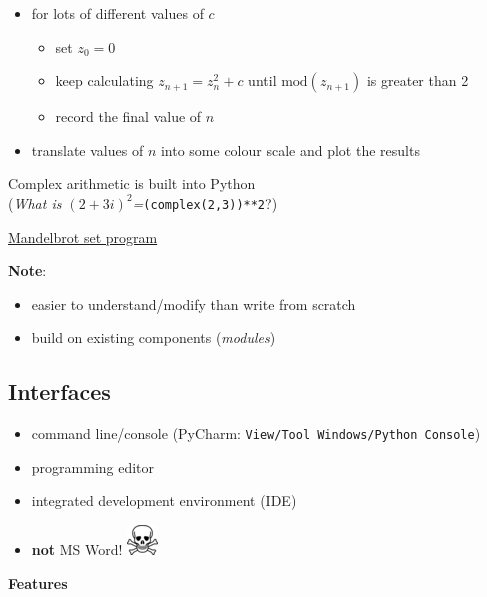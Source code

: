 \documentclass[]{tufte-handout}
\begin{document}
\begin{itemize}
\itemsep1pt\parskip0pt
\item
  for lots of different values of \(c\)

  \begin{itemize}
  \itemsep1pt\parskip0pt
  \item
    set \(z_0=0\)
  \item
    keep calculating \(z_{n+1}=z_n^2+c\) until \(\textrm{mod}(z_{n+1})\)
    is greater than 2
  \item
    record the final value of \(n\)
  \end{itemize}
\item
  translate values of \(n\) into some colour scale and plot the results
\end{itemize}

Complex arithmetic is built into Python\\(\emph{What is
\((2+3i)^2\)=}\texttt{(complex(2,3))**2}?)

\href{../code/mandelbrot.py}{Mandelbrot set program}

\textbf{Note}:

\begin{itemize}
\itemsep1pt\parskip0pt
\item
  easier to understand/modify than write from scratch
\item
  build on existing components (\emph{modules})
\end{itemize}

\subsection{Interfaces}\label{interfaces}

\begin{itemize}
\itemsep1pt\parskip0pt
\item
  command line/console (PyCharm:
  \texttt{View/Tool Windows/Python Console})
\item
  programming editor
\item
  integrated development environment (IDE)
\item
  \textbf{not} MS Word! \includegraphics{pix/skullcross_tiny.png}
\end{itemize}

\textbf{Features}
\end{document}
